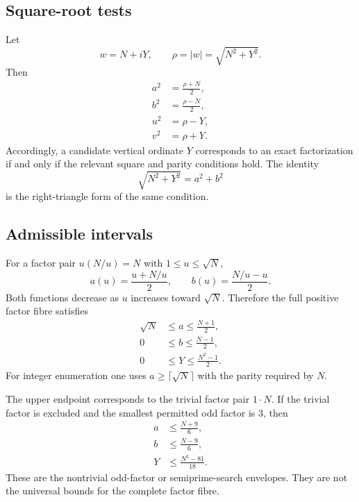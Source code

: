 \documentclass[11pt]{article}
\theoremstyle{definition}
\newcommand{\1}{\mathbf{1}}
\begin{document}
\subsection{Square-root tests}

Let
\begin{equation}
 w=N+iY,
 \qquad
 \rho=|w|=\sqrt{N^2+Y^2}.
 \label{eq:rho-full}
\end{equation}
Then
\begin{align}
 a^2&=\frac{\rho+N}{2},
 \label{eq:a-square}\\
 b^2&=\frac{\rho-N}{2},
 \label{eq:b-square}\\
 u^2&=\rho-Y,
 \label{eq:u-square}\\
 v^2&=\rho+Y.
 \label{eq:v-square}
\end{align}
Accordingly, a candidate vertical ordinate $Y$ corresponds to an exact factorization if and only if the relevant square and parity conditions hold.  The identity
\begin{equation}
 \sqrt{N^2+Y^2}=a^2+b^2
 \label{eq:hypotenuse}
\end{equation}
is the right-triangle form of the same condition.

\subsection{Admissible intervals}

For a factor pair $u(N/u)=N$ with $1\le u\le\sqrt N$,
\begin{equation}
 a(u)=\frac{u+N/u}{2},
 \qquad
 b(u)=\frac{N/u-u}{2}.
 \label{eq:ab-u}
\end{equation}
Both functions decrease as $u$ increases toward $\sqrt N$.  Therefore the full positive factor fibre satisfies
\begin{align}
 \sqrt N&\le a\le\frac{N+1}{2},
 \label{eq:a-full-range}\\
 0&\le b\le\frac{N-1}{2},
 \label{eq:b-full-range}\\
 0&\le Y\le\frac{N^2-1}{2}.
 \label{eq:Y-full-range}
\end{align}
For integer enumeration one uses $a\ge\lceil\sqrt N\rceil$ with the parity required by $N$.

The upper endpoint corresponds to the trivial factor pair $1\cdot N$.  If the trivial factor is excluded and the smallest permitted odd factor is $3$, then
\begin{align}
 a&\le\frac{N+9}{6},
 \label{eq:a-three}\\
 b&\le\frac{N-9}{6},
 \label{eq:b-three}\\
 Y&\le\frac{N^2-81}{18}.
 \label{eq:Y-three}
\end{align}
These are the nontrivial odd-factor or semiprime-search envelopes.  They are not the universal bounds for the complete factor fibre.
\end{document}
